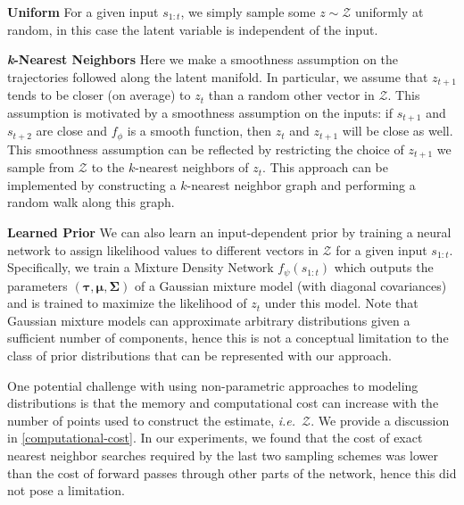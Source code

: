 \documentclass{article}
\begin{document}


\textbf{Uniform} \quad
For a given input $s_{1:t}$, we simply sample some $z \sim \mathcal{Z}$ uniformly at random, in this case the latent variable is independent of the input.

\textbf{\emph{k}-Nearest Neighbors} \quad
Here we make a smoothness assumption on the trajectories followed along the latent manifold.
In particular, we assume that $z_{t+1}$ tends to be closer (on average) to $z_t$ than a random other vector in $\mathcal{Z}$.
This assumption is motivated by a smoothness assumption on the inputs: if $s_{t+1}$ and $s_{t+2}$ are close and $f_\phi$ is a smooth function, then $z_t$ and $z_{t+1}$ will be close as well.
This smoothness assumption can be reflected by restricting the choice of $z_{t+1}$ we sample from $\mathcal{Z}$ to the $k$-nearest neighbors of $z_t$.
This approach can be implemented by constructing a $k$-nearest neighbor graph and performing a random walk along this graph.

\textbf{Learned Prior} \quad
We can also learn an input-dependent prior by training a neural network to assign likelihood values to different vectors in $\mathcal{Z}$ for a given input $s_{1:t}$.
Specifically, we train a Mixture Density Network \citep{mixture-density-networks} $f_\psi(s_{1:t})$ which outputs the parameters $(\bm{\tau}, \bm{\mu}, \bm{\Sigma})$ of a Gaussian mixture model (with diagonal covariances) and is trained to maximize the likelihood of $z_t$ under this model.
Note that Gaussian mixture models can approximate arbitrary distributions given a sufficient number of components, hence this is not a conceptual limitation to the class of prior distributions that can be represented with our approach.

One potential challenge with using non-parametric approaches to modeling distributions is that the memory and computational cost can increase with the number of points used to construct the estimate, \emph{i.e.}\ $\mathcal{Z}$.
We provide a discussion in \cref{computational-cost}.
In our experiments, we found that the cost of exact nearest neighbor searches required by the last two sampling schemes was lower than the cost of forward passes through other parts of the network, hence this did not pose a limitation.
\end{document}
